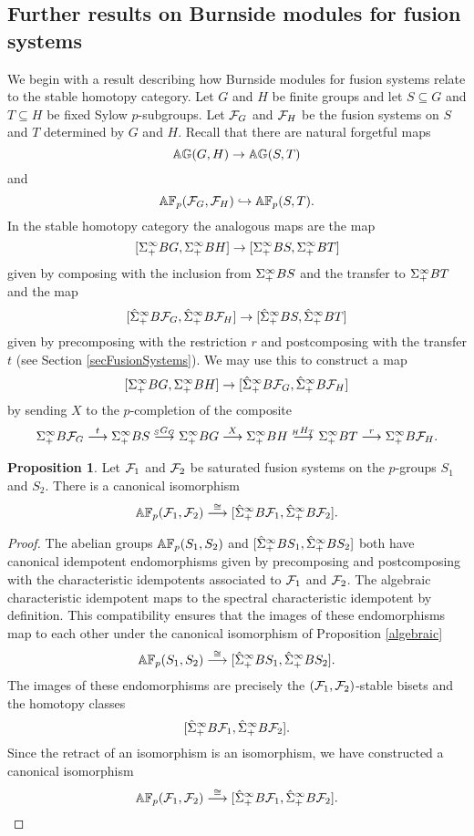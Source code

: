 \documentclass[10pt]{amsart}
\theoremstyle{definition}
\newtheorem{proposition}[theorem]{Proposition}
\begin{document}
\subsection{Further results on Burnside modules for fusion systems}
We begin with a result describing how Burnside modules for fusion systems relate to the stable homotopy category. Let $G$ and $H$ be finite groups and let $S \subseteq G$ and $T \subseteq H$ be fixed Sylow $p$-subgroups. Let $\mathcal{F}_G$ and $\mathcal{F}_H$ be the fusion systems on $S$ and $T$ determined by $G$ and $H$. Recall that there are natural forgetful maps
\[
\mathbb{A} \mathbb{G}(G,H) \rightarrow \mathbb{A} \mathbb{G}(S,T)
\]
and
\[
\mathbb{A} \mathbb{F}_p(\mathcal{F}_G, \mathcal{F}_H) \hookrightarrow \mathbb{A} \mathbb{F}_p(S,T).
\]
In the stable homotopy category the analogous maps are the map
\[
[\Sigma^{\infty}_{+} BG, \Sigma^{\infty}_{+} BH] \rightarrow [\Sigma^{\infty}_{+} BS, \Sigma^{\infty}_{+} BT]
\]
given by composing with the inclusion from $\Sigma^{\infty}_{+} BS$ and the transfer to $\Sigma^{\infty}_{+} BT$ and the map
\[
[\hat{\Sigma}^{\infty}_{+} B\mathcal{F}_G, \hat{\Sigma}^{\infty}_{+} B\mathcal{F}_H] \rightarrow [\hat{\Sigma}^{\infty}_{+} BS, \hat{\Sigma}^{\infty}_{+} BT]
\]
given by precomposing with the restriction $r$ and postcomposing with the transfer $t$ (see Section \ref{secFusionSystems}). We may use this to construct a map
\[
[\Sigma^{\infty}_{+} BG, \Sigma^{\infty}_{+} BH] \rightarrow [\hat{\Sigma}^{\infty}_{+} B\mathcal{F}_G, \hat{\Sigma}^{\infty}_{+} B\mathcal{F}_H]
\]
by sending $X$ to the $p$-completion of the composite
\[
\Sigma^{\infty}_{+} B\mathcal{F}_G \overset{t}{\longrightarrow} \Sigma^{\infty}_{+} BS \overset{{}_{S}G_{G}}{\longrightarrow} \Sigma^{\infty}_{+} BG \overset{X}{\longrightarrow} \Sigma^{\infty}_{+} BH \overset{{}_{H}H_{T}}{\longrightarrow} \Sigma^{\infty}_{+} BT \overset{r}{\longrightarrow} \Sigma^{\infty}_{+} B\mathcal{F}_H.
\]

\begin{proposition} \label{aniso}
Let $\mathcal{F}_1$ and $\mathcal{F}_2$ be saturated fusion systems on the $p$-groups $S_1$ and $S_2$. There is a canonical isomorphism
\[
\mathbb{A} \mathbb{F}_p(\mathcal{F}_1, \mathcal{F}_2) \overset{\cong}{\longrightarrow} [\hat{\Sigma}^{\infty}_{+} B\mathcal{F}_1, \hat{\Sigma}^{\infty}_{+} B\mathcal{F}_2].
\]
\end{proposition}
\begin{proof}
The abelian groups $\mathbb{A} \mathbb{F}_p(S_1, S_2)$ and $[\hat{\Sigma}^{\infty}_{+} BS_1, \hat{\Sigma}^{\infty}_{+} BS_2]$ both have canonical idempotent endomorphisms given by precomposing and postcomposing with the characteristic idempotents associated to $\mathcal{F}_1$ and $\mathcal{F}_2$. The algebraic characteristic idempotent maps to the spectral characteristic idempotent by definition. This compatibility ensures that the images of these endomorphisms map to each other under the canonical isomorphism of Proposition \ref{algebraic}
\[
\mathbb{A} \mathbb{F}_p(S_1, S_2) \overset{\cong}{\longrightarrow} [\hat{\Sigma}^{\infty}_{+} BS_1, \hat{\Sigma}^{\infty}_{+} BS_2].
\]
The images of these endomorphisms are precisely the $(\mathcal{F}_1, \mathcal{F}_2)$-stable bisets and the homotopy classes
\[
[\hat{\Sigma}^{\infty}_{+} B\mathcal{F}_1, \hat{\Sigma}^{\infty}_{+} B\mathcal{F}_2].
\]
Since the retract of an isomorphism is an isomorphism, we have constructed a canonical isomorphism
\[
\mathbb{A} \mathbb{F}_p(\mathcal{F}_1, \mathcal{F}_2) \overset{\cong}{\longrightarrow} [\hat{\Sigma}^{\infty}_{+} B\mathcal{F}_1, \hat{\Sigma}^{\infty}_{+} B\mathcal{F}_2].
\qedhere\]
\end{proof}
\end{document}
